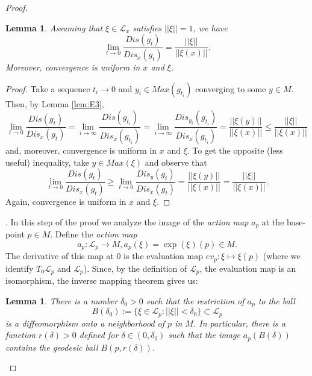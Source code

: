\documentclass[12pt]{amsbook}%
\newtheorem{lem}[thm]{Lemma}
\theoremstyle{definition}
\theoremstyle{remark}
\numberwithin{section}{chapter}
\numberwithin{subsection}{section}
\numberwithin{figure}{chapter}
\def\eps{\epsilon}
\def\cL{{\mathscr{L}}}
\begin{document}
{{\begin{proof}
\begin{lem}\label{lem:E4}
Assuming that $\xi\in \cL_x$ satisfies $||\xi||=1$, we have
$$
\lim_{t\to 0} \frac{Dis(g_t)}{Dis_x(g_t)}= \frac{||\xi||}{||\xi(x)||}.
$$
Moreover, convergence is uniform in $x$ and $\xi$. 
\end{lem}
\begin{proof} Take a sequence $t_i\to 0$ and $y_i\in Max(g_{t_i})$ converging to some $y\in M$. %
Then, by Lemma \ref{lem:E3},
$$
\lim_{t\to 0} \frac{Dis(g_t)}{Dis_x(g_t)}=\lim_{i\to\infty} \frac{Dis(g_{t_i})}{Dis_x(g_{t_i})}= \lim_{i\to\infty} \frac{Dis_{y_i}(g_{t_i})}{Dis_x(g_{t_i})}= 
 \frac{||\xi(y)||}{||\xi(x)||}\leqslant \frac{||\xi||}{||\xi(x)||}
$$
and, moreover, convergence is uniform in $x$ and $\xi$.  To get the opposite (less useful) inequality, take $y\in Max(\xi)$ and observe that 
$$
\lim_{t\to 0} \frac{Dis(g_t)}{Dis_x(g_t)} \geqslant \lim_{t\to 0} \frac{Dis_y(g_t)}{Dis_x(g_t)}=  \frac{||\xi(y)||}{||\xi(x)||}= \frac{||\xi||}{||\xi(x)||}. 
$$
Again, convergence is uniform in $x$ and $\xi$. 
\end{proof}


. In this step of the proof we analyze the image of the {\em action map} $a_p$ at the base-point $p\in M$. Define the {\em action map}  
$$
a_p: %
\cL_p \to M, a_p(\xi)= \exp(\xi)(p)\in M. 
$$
The derivative of this map at $0$ is the evaluation map $ev_p: \xi\mapsto \xi(p)$ (where we identify $T_0\cL_p$ and $\cL_p$). Since, by the definition of $\cL_p$, the 
evaluation map is an isomorphism, the inverse mapping theorem gives us:

\begin{lem}\label{lem:E5}
There is a number $\delta_0>0$ such that the restriction of $a_p$ to the ball 
$$
B(\delta_0):= \{\xi\in \cL_p: ||\xi||<\delta_0\}\subset \cL_p
$$
is a diffeomorphism onto a neighborhood of $p$ in $M$. In particular, there is a function $r(\delta)>0$ defined for $\delta\in (0,\delta_0)$ such that 
the image $a_p(B(\delta))$ contains the geodesic ball  
$B(p, r(\delta))$. 
\end{lem} 


\end{proof}}}
\end{document}
